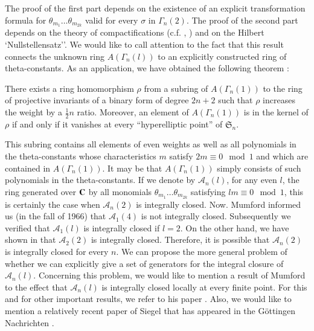 The proof of the first part depends on the existence of an explicit transformation formula for $\theta_{m_{1}}\ldots\theta_{m_{2k}}$ valid for every $\sigma$ in $\Gamma_{n}(2)$. The proof of the second part depends on the theory of compactifications (c.f. \cite{art12-key1}, \cite{art12-key4}) and on the Hilbert `Nullstellensatz''. We would like to call attention to the fact that this result connects the unknown ring $A(\Gamma_{n}(l))$ to an explicitly constructed ring of theta-constants. As an application, we have obtained the following theorem \cite{art12-key12}:

There exists a ring homomorphism $\rho$ from a subring of $A(\Gamma_{n}(1))$ to the ring of projective invariants of a binary form of degree $2n+2$ such that $\rho$ increases the weight by a $\frac{1}{2}n$ ratio. Moreover, an element of $A(\Gamma_{n}(1))$ is in the kernel of $\rho$ if and only if it vanishes at every ``hyperelliptic point'' of $\mathfrak{S}_{n}$.

This subring contains all elements of even weights as well as all polynomials in the theta-constants whose characteristics $m$ satisfy $2m\equiv 0\mod 1$ and which are contained in $A(\Gamma_{n}(1))$. It may be that $A(\Gamma_{n}(1))$ simply consists of such polynomials in the theta-constants. If we denote by $\mathscr{A}_{n}(l)$, for any even $l$, the ring generated over $\mathbf{C}$ by all monomials $\theta_{m_{1}}\ldots\theta_{m_{2k}}$ satisfying $lm\equiv 0\mod 1$, this is certainly the case when $\mathscr{A}_{n}(2)$ is integrally closed. Now. Mumford informed us (in the fall of 1966) that $\mathscr{A}_{1}(4)$ is not integrally closed. Subsequently we verified that $\mathscr{A}_{1}(l)$ is integrally closed if $l=2$. On the other hand, we have shown in \cite{art12-sec8} that $\mathscr{A}_{2}(2)$ is integrally closed. Therefore, it is possible that $\mathscr{A}_{n}(2)$ is integrally closed for every $n$. We can propose the more general problem of whether we can explicitly give a set of generators for the integral closure of $\mathscr{A}_{n}(l)$. Concerning this problem, we would like to mention a result of Mumford to the effect that $\mathscr{A}_{n}(l)$ is integrally closed locally at every finite point. For this and for other important results, we refer to his paper \cite{art12-key16}. Also, we would like to mention a relatively recent paper of Siegel that has appeared in the G\"ottingen Nachrichten \cite[III]{art12-key22}.


